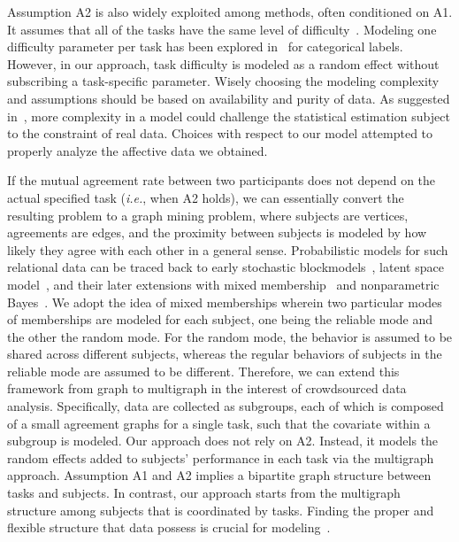 \documentclass[10pt,journal,letterpaper,compsoc,twoside]{IEEEtran}
\begin{document}
Assumption A2 is also widely exploited among methods, often conditioned on A1.
It assumes that all of the tasks have the same level of difficulty~\citep{liu2012variational,raykar2012eliminating}.
Modeling one difficulty parameter per task 
has been explored in~\cite{whitehill2009whose} for categorical labels. 
However, in our approach, task difficulty is modeled as a random effect 
without subscribing a task-specific parameter. 
Wisely choosing the modeling complexity and assumptions should 
be {based} on availability and purity of data.  
As suggested in~\cite{sheshadri2013square}, 
more complexity in a model could challenge the statistical estimation subject 
to the constraint of real data. Choices with respect to our model attempted to
properly analyze the affective data we obtained. 

If the mutual agreement rate between two participants
 does not depend on the actual specified task ({\it i.e.}, when A2 holds), we can essentially convert the 
 resulting problem to a graph mining problem, where subjects are vertices, agreements are edges, and the
 proximity between subjects is modeled by how likely they agree with each other in a general sense. 
 Probabilistic models for such relational data
 can be traced back to early stochastic blockmodels~\citep{wang1987stochastic,nowicki2001estimation},
 latent space model~\citep{hoff2002latent},
 and their later extensions with mixed membership~\citep{airoldi2009mixed,kim2012latent} and
 nonparametric Bayes~\citep{kemp2006learning}. 
 We adopt the idea of mixed memberships wherein two particular modes of memberships
 are modeled for each subject, one being the reliable mode and the other the random mode. 
For the random mode, the behavior is assumed to be shared across different subjects, whereas the 
 regular behaviors of subjects in the reliable mode are assumed to be different. 
 Therefore, we can extend this framework from graph to multigraph in the
 interest of crowdsourced data analysis. Specifically,
 data are collected as subgroups, each of which is composed of 
 a small agreement graphs for a single task, such that the covariate within a subgroup is modeled. 
Our {approach} does not rely on A2.
Instead, it models the random effects added to subjects' performance in each task via the multigraph approach.
{Assumption A1 and A2 implies a bipartite graph structure between tasks and subjects.
In contrast, our approach starts from the multigraph structure among subjects that is coordinated by tasks.
Finding the proper and flexible structure that data possess is crucial for modeling~\cite{kemp2008discovery}.} 
 
\end{document}
